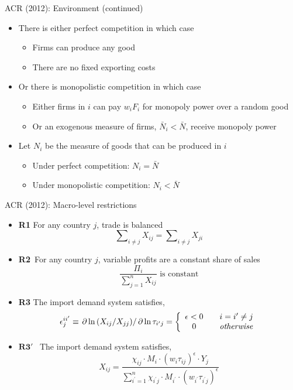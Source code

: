 \documentclass[10pt,notes=hide]{beamer}
\begin{document}
\begin{frame}{ACR (2012): Environment (continued)}
\begin{itemize}
\item There is either perfect competition in which case
\begin{itemize}
\item Firms can produce any good
\item There are no fixed exporting costs
\end{itemize}
\item Or there is monopolistic competition in which case
\begin{itemize}
\item Either firms in $i$ can pay $w_{i}F_{i}$ for monopoly power over a
random good
\item Or an exogenous measure of firms, $\bar{N}_{i}<\bar{N}$, receive
monopoly power
\end{itemize}
\item Let $N_{i}$ be the measure of goods that can be produced in $i$%
\begin{itemize}
\item Under perfect competition: $N_{i}=\bar{N}$
\item Under monopolistic competition: $N_{i}<\bar{N}$
\end{itemize}
\end{itemize}
\end{frame}
\begin{frame}{ACR (2012): Macro-level restrictions}
\begin{itemize}
\item \textbf{R1} For any country $j$, trade is balanced%
\begin{equation*}
\sum\nolimits_{i\not=j}X_{ij}=\sum\nolimits_{i\not=j}X_{ji}
\end{equation*}
\item \textbf{R2}\emph{\ }For any country $j$, variable profits are a
constant share of sales%
\begin{equation*}
\frac{\Pi _{i}}{\sum\nolimits_{j=1}^{n}X_{ij}}\text{\ is constant}
\end{equation*}
\item \textbf{R3} The import demand system satisfies,
\begin{equation*}
\epsilon _{j}^{ii^{\prime }}\equiv \left. \partial \ln \left(
X_{ij}/X_{jj}\right) \right/ \partial \ln \tau _{i^{\prime }j}=\left\{ 
\begin{array}{ccc}
\epsilon <0 &  & i=i^{\prime }\neq j \\ 
0 &  & \text{\emph{otherwise}}
\end{array}%
\right.
\end{equation*}
\item $\mathbf{R3}'$ \ The import demand system satisfies,%
\begin{equation*}
X_{ij}=\frac{\chi _{ij}\cdot M_{i}\cdot \left( w_{i}\tau _{ij}\right)
^{\epsilon }\cdot Y_{j}}{\sum\nolimits_{i^{\prime }=1}^{n}\chi
_{i^{\prime }j}\cdot M_{i^{\prime }}\cdot \left( w_{i^{\prime }}\tau
_{i^{\prime }j}\right) ^{\epsilon }}
\end{equation*}
\end{itemize}
\end{frame}
\end{document}
